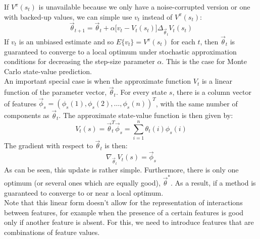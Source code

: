 \documentclass[a4paper]{article}
\begin{document}
If $V^{\pi}(s_t)$ is unavailable because we only have a noise-corrupted version or one with backed-up values, we can simple use $v_t$ instead of $V^{\pi}(s_t)$:
\begin{equation}
\overrightarrow{\theta}_{t+1} = \overrightarrow{\theta}_t + \alpha \big[ v_t - V_t(s_t) \big] \Delta_{\overrightarrow{\theta}_t} V_t(s_t)
\end{equation}
If $v_t$ is an unbiased estimate and so $E\{v_t\} = V^{\pi}(s_t)$ for each $t$, then $\overrightarrow{\theta}_t$ is guaranteed to converge to a local optimum under stochastic approximation conditions for decreasing the step-size parameter $\alpha$. This is the case for Monte Carlo state-value prediction.\\

An important special case is when the approximate function $V_t$ is a linear function of the parameter vector, $\overrightarrow{\theta}_t$. For every state $s$, there is a column vector of features $\overrightarrow{\phi}_s = (\phi_s(1), \phi_s(2), \dots, \phi_s(n))^T$, with the same number of components as $\overrightarrow{\theta}_t$. The approximate state-value function is then given by:
\begin{equation}
V_t(s) = \overrightarrow{\theta}_t^T \overrightarrow{\phi}_s = \sum_{i=1}^n \theta_t(i) \phi_s(i)
\end{equation}
The gradient with respect to $\overrightarrow{\theta}_t$ is then:
\begin{equation}
\nabla_{\overrightarrow{\theta}_t} V_t(s) = \overrightarrow{\phi}_s
\end{equation}
As can be seen, this update is rather simple. Furthermore, there is only one optimum (or several ones which are equally good), $\overrightarrow{\theta}^{*}$. As a result, if a method is guaranteed to converge to or near a local optimum.\\
Note that this linear form doesn't allow for the representation of interactions between features, for example when the presence of a certain features is good only if another feature is absent. For this, we need to introduce features that are combinations of feature values.\\
\end{document}
